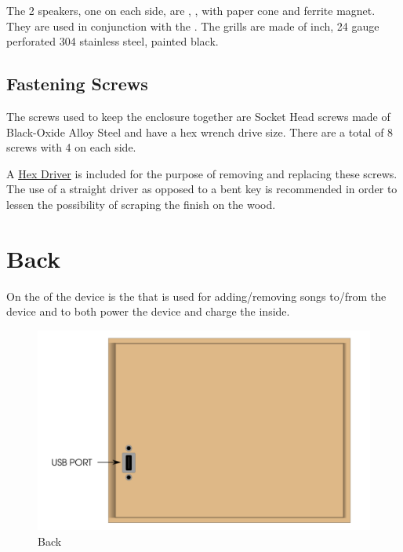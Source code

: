 The \num{2} speakers, one on each side, are \mono{8\thinspace\small{$\Omega$}},
,  with paper cone and ferrite magnet.
They are used in conjunction with the \hyperref[Audio]{}.  The grills are
made of  inch, \num{24} gauge perforated \num{304} stainless steel,
painted black.

\section{Fastening Screws} \label{Fastening Screws}

The screws used to keep the enclosure together are  Socket Head
screws made of Black-Oxide Alloy Steel and have a  hex wrench drive
size.  There are a total of \num{8} screws with \num{4} on each side.


A  \hyperref[Hex Driver]{Hex Driver} is included for the purpose
of removing and replacing these screws.  The use of a straight driver as
opposed to a bent key is recommended in order to lessen the possibility of
scraping the finish on the wood.

\chapter{Back} \label{Back}

On the  of the device is the  that is used for adding/removing
songs to/from the device and to both power the device and charge the
\hyperref[Rechargeable Battery]{} inside.

\begin{figure}[H]
\centering
  \includegraphics{images/back.png}
\caption{Back}
\end{figure}

